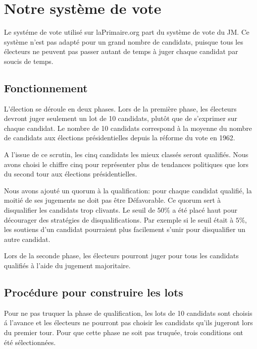 \documentclass[conference]{IEEEtran}
\begin{document}




\section{Notre syst\`eme de vote}
\label{sec:laprimaire}

Le syst\'eme de vote utilis\'e sur laPrimaire.org part du syst\`eme de vote du JM. Ce syst\`eme n'est pas adapt\'e pour un grand nombre de candidats, puisque tous les \'electeurs ne peuvent pas passer autant de temps \`a juger chaque candidat par soucis de temps.

\subsection{Fonctionnement}
L'\'election se d\'eroule en deux phases. Lors de la premi\`ere phase, les \'electeurs devront juger seulement un lot de 10 candidats, plut\^ot que de s'exprimer sur chaque candidat. Le nombre de 10 candidats correspond \`a la moyenne du nombre de candidats aux \'elections pr\'esidentielles depuis la r\'eforme du vote en 1962.

A l'issue de ce scrutin, les cinq candidats les mieux class\'es seront qualifi\'es. Nous avons choisi le chiffre cinq pour repr\'esenter plus de tendances politiques que lors du second tour aux \'elections pr\'esidentielles. 

Nous avons ajout\'e un quorum \`a la qualification: pour chaque candidat qualifi\'e, la moiti\'e de ses jugements ne doit pas \^etre D\'efavorable. Ce quorum sert \`a disqualifier les candidats trop clivants. Le seuil de $50\%$ a \'et\'e plac\'e haut pour d\'ecourager des strat\'egies de disqualifications. Par exemple si le seuil \'etait \`a $5\%$, les soutiens d'un candidat pourraient plus facilement s'unir pour disqualifier un autre candidat.

Lors de la seconde phase, les \'electeurs pourront juger pour tous les candidats qualifi\'es \`a l'aide du jugement majoritaire.


\subsection{Proc\'edure pour construire les lots}

Pour ne pas truquer la phase de qualification, les lots de 10 candidats sont choisis \'a l'avance et les \'electeurs ne pourront pas choisir les candidats qu'ils jugeront lors du premier tour. Pour que cette phase ne soit pas truqu\'ee, trois conditions ont \'et\'e s\'electionn\'ees.
\end{document}
